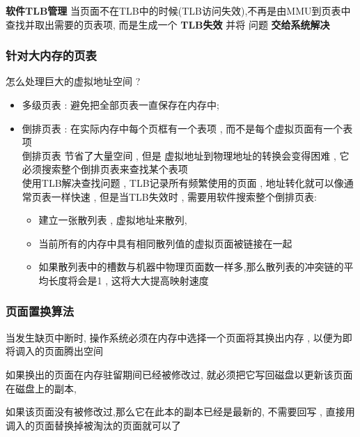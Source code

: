 \documentclass[UTF8,a4paper]{ctexart}
\begin{document}
\textbf{软件TLB管理}
当页面不在TLB中的时候(TLB访问失效),不再是由MMU到页表中查找并取出需要的页表项, 而是生成一个 \textbf{TLB失效} 并将 问题 \textbf{交给系统解决}


\subsubsection{针对大内存的页表}
怎么处理巨大的虚拟地址空间 ?

\begin{itemize}
	\item 多级页表 : 避免把全部页表一直保存在内存中;
	\item 倒排页表 : 在实际内存中每个页框有一个表项 , 而不是每个虚拟页面有一个表项 \\
	      倒排页表 节省了大量空间 , 但是 虚拟地址到物理地址的转换会变得困难 , 它必须搜索整个倒排页表来查找某个表项\\
	      使用TLB解决查找问题 , TLB记录所有频繁使用的页面 , 地址转化就可以像通常页表一样快速 , 但是当TLB失效时 , 需要用软件搜索整个倒排页表:
	      \begin{itemize}
		      \item 建立一张散列表 , 虚拟地址来散列,
		      \item 当前所有的内存中具有相同散列值的虚拟页面被链接在一起
		      \item 如果散列表中的槽数与机器中物理页面数一样多,那么散列表的冲突链的平均长度将会是1 , 这将大大提高映射速度
	      \end{itemize}

\end{itemize}

\subsubsection{页面置换算法}
当发生缺页中断时, 操作系统必须在内存中选择一个页面将其换出内存 , 以便为即将调入的页面腾出空间

如果换出的页面在内存驻留期间已经被修改过, 就必须把它写回磁盘以更新该页面在磁盘上的副本,

如果该页面没有被修改过,那么它在此本的副本已经是最新的, 不需要回写 , 直接用调入的页面替换掉被淘汰的页面就可以了
\end{document}
